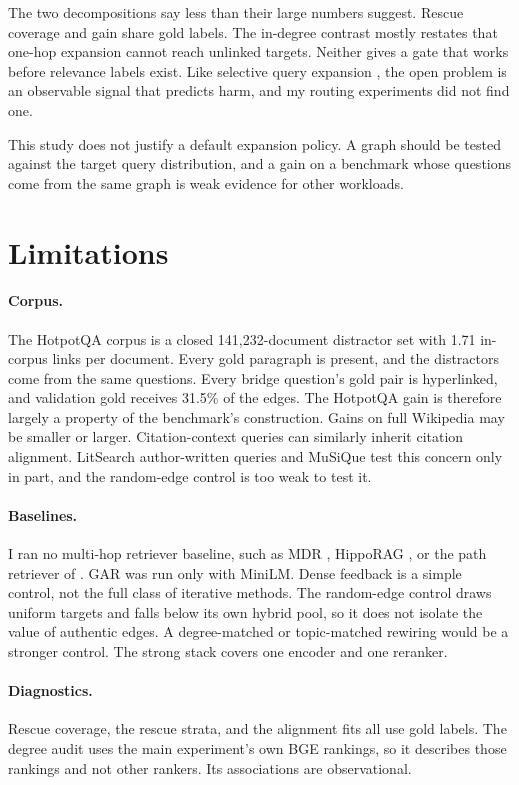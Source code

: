 \documentclass[10pt,twocolumn]{article}
\begin{document}
The two decompositions say less than their large numbers suggest. Rescue
coverage and gain share gold labels. The in-degree contrast mostly restates
that one-hop expansion cannot reach unlinked targets. Neither gives a gate that
works before relevance labels exist. Like selective query expansion
\citep{cronentownsend2004selective}, the open problem is an observable signal
that predicts harm, and my routing experiments did not find one.

This study does not justify a default expansion policy. A graph should be
tested against the target query distribution, and a gain on a benchmark whose
questions come from the same graph is weak evidence for other workloads.

\section{Limitations}

\paragraph{Corpus.}
The HotpotQA corpus is a closed 141,232-document distractor set with 1.71
in-corpus links per document. Every gold paragraph is present, and the
distractors come from the same questions. Every bridge question's gold pair is
hyperlinked, and validation gold receives 31.5\% of the edges. The HotpotQA
gain is therefore largely a property of the benchmark's construction. Gains on
full Wikipedia may be smaller or larger. Citation-context queries can similarly
inherit citation alignment. LitSearch author-written queries and MuSiQue test
this concern only in part, and the random-edge control is too weak to test it.

\paragraph{Baselines.}
I ran no multi-hop retriever baseline, such as MDR \citep{xiong2021mdr},
HippoRAG \citep{gutierrez2024hipporag}, or the path retriever of
\citet{asai2020paths}. GAR was run only with MiniLM. Dense feedback is a simple
control, not the full class of iterative methods. The random-edge control
draws uniform targets and falls below its own hybrid pool, so it does not
isolate the value of authentic edges. A degree-matched or topic-matched
rewiring would be a stronger control. The strong stack covers one
encoder and one reranker.

\paragraph{Diagnostics.}
Rescue coverage, the rescue strata, and the alignment fits all use gold labels.
The degree audit uses the main experiment's own BGE rankings, so it describes
those rankings and not other rankers. Its associations are observational.
\end{document}
